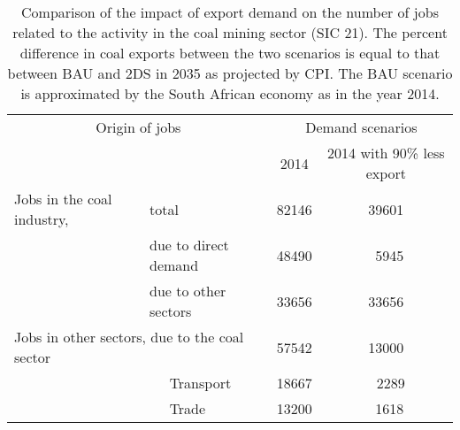 \documentclass[12pt,english]{article}
\begin{document}
\begin{table}[ht]
	\centering
	\begin{tabular}{lp{20pt}lcc}
		\multicolumn{3}{c}{Origin of jobs} &\multicolumn{2}{c}{Demand scenarios}   \\ 
		\multicolumn{3}{c}{} & 2014 & 2014 with 90\% less export \\ 
		\midrule
		Jobs in the coal industry,	& \multicolumn{2}{l}{total}  & 82146 & 39601 \\ 
		& \multicolumn{2}{l}{due to direct demand}  & 48490 & \, 5945 \\ 
		
		& \multicolumn{2}{l}{due to other sectors}  & 33656 & 33656 \\ 
		\midrule
		\multicolumn{3}{l}{Jobs in other sectors, due to the coal sector}  & 57542 &  13000 \\ 
		& 						 & Transport & 18667 &  \ \,2289 \\ 
		& 						 & Trade & 13200 &  \  1618 \\ 
		\bottomrule
	\end{tabular}
	\caption{Comparison of the impact of export demand on the number of jobs related to the activity in the coal mining sector (SIC 21). The percent difference in coal exports between the two scenarios is equal to that between BAU and 2DS in 2035 as projected by CPI. The BAU scenario is approximated by the South African economy as in the year 2014.}
\end{table}
\end{document}
